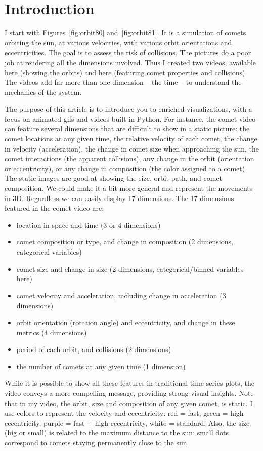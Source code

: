 \documentclass[oneside,10pt]{book}
\begin{document}
\section{Introduction}\label{vizintro}

I start with Figures~\ref{fig:orbit80} and~\ref{fig:orbit81}. It is a simulation of comets orbiting the sun, at various velocities, with various orbit orientations and eccentricities. The goal is to assess the risk of collisions. The pictures do a poor job at rendering all the dimensions involved. Thus I created two videos,
available \href{https://www.youtube.com/watch?v=GD_ZPb48lmk}{here} (showing the orbits) and \href{https://www.youtube.com/watch?v=CeYmsBdfrHM}{here} (featuring comet properties and collisions). The videos add far more than one dimension -- the time -- to understand the mechanics of the system.

The purpose of this article is to introduce you to enriched visualizations, with a focus on animated gifs and videos built in Python.
For instance, the comet video can feature several dimensions that are difficult to show in a static picture: the comet locations at any given time, the relative velocity of each comet,
the change in velocity (acceleration), the change in comet size when approaching the sun,  the comet interactions (the apparent collisions), any change in the orbit (orientation or eccentricity), or any change in composition (the color assigned to a comet). The static images are good at showing the size, orbit path, and comet composition. We could make it a bit more general and represent the movements in 3D. Regardless we can easily display  17 dimensions. The 17 dimensions featured in the comet video are:
\begin{itemize}
\item location in space and time (3 or 4 dimensions)
\item comet composition or type, and change in composition (2 dimensions, categorical variables)
\item comet size and change in size (2 dimensions, categorical/binned variables here)
\item comet velocity and acceleration, including change in acceleration (3 dimensions)
\item orbit orientation (rotation angle) and eccentricity, and change in these metrics (4 dimensions)
\item period of each orbit, and collisions (2 dimensions)
\item the number of comets at any given time (1 dimension)
\end{itemize}
\vspace{1ex}
While it is possible to show all these features in traditional time series plots, the video conveys a more compelling message, providing strong visual insights. Note that in my video, the orbit, size and composition of any given comet, is static.  I use colors to represent the velocity and eccentricity: red = fast, green = high eccentricity, purple = fast + high eccentricity, white = standard. Also, the size (big or small) is related to the maximum distance to the sun: small dots correspond to comets staying permanently close to the sun.
\end{document}
